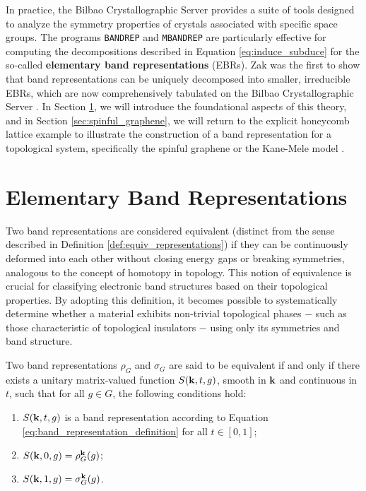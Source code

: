 In practice, the Bilbao Crystallographic Server \cite{bilbao_1} provides a suite of tools designed to analyze the symmetry properties of crystals associated with specific space groups. The programs \texttt{BANDREP} and \texttt{MBANDREP} are particularly effective for computing the decompositions described in Equation \ref{eq:induce_subduce} for the so-called \textbf{elementary band representations} (EBRs). Zak \cite{zak1980, zak1981} was the first to show that band representations can be uniquely decomposed into smaller, irreducible EBRs, which are now comprehensively tabulated on the Bilbao Crystallographic Server \cite{topological_quantum_chemistry2017, bilbao_1}. In Section \ref{sec:EBRs_topological}, we will introduce the foundational aspects of this theory, and in Section \ref{sec:spinful_graphene}, we will return to the explicit honeycomb lattice example to illustrate the construction of a band representation for a topological system, specifically the spinful graphene or the Kane-Mele model \cite{kane-mele2005}.

\section{Elementary Band Representations} \label{sec:EBRs_topological}

Two band representations are considered equivalent (distinct from the sense described in Definition \ref{def:equiv_representations}) if they can be continuously deformed into each other without closing energy gaps or breaking symmetries, analogous to the concept of homotopy in topology. This notion of equivalence is crucial for classifying electronic band structures based on their topological properties. By adopting this definition, it becomes possible to systematically determine whether a material exhibits non-trivial topological phases $-$ such as those characteristic of topological insulators $-$ using only its symmetries and band structure.

\begin{definition} \label{def:equiv_bandrep}
Two band representations \( \rho_G \) and \( \sigma_G \) are said to be equivalent if and only if there exists a unitary matrix-valued function \( S({\vb{k}},t,g) \), smooth in \( {\vb{k}} \) and continuous in \( t \), such that for all \( g \in G \), the following conditions hold:
\begin{enumerate}
\item \( S({\vb{k}}, t, g) \) is a band representation according to Equation \ref{eq:band_representation_definition} for all \( t \in [0,1] \);
\item \( S({\vb{k}}, 0, g) = \rho_G^{\vb{k}}(g) \);
\item \( S({\vb{k}}, 1, g) = \sigma_G^{\vb{k}}(g) \).
\end{enumerate}
\end{definition}

